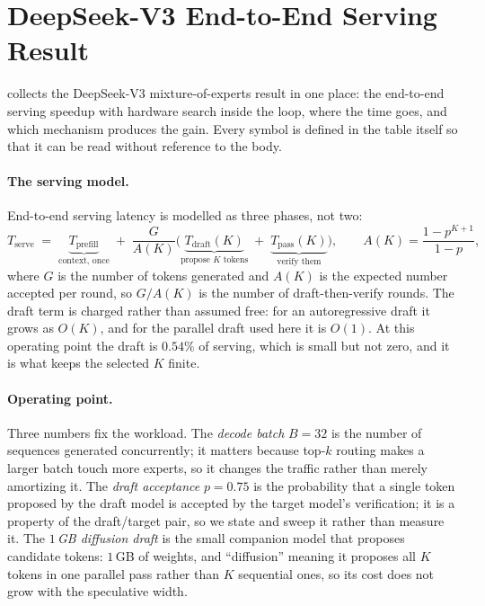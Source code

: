 \section{DeepSeek-V3 End-to-End Serving Result}
\label{app:deepseek_summary}

 collects the DeepSeek-V3 mixture-of-experts result in
one place: the end-to-end serving speedup with hardware search inside the loop,
where the time goes, and which mechanism produces the gain. Every symbol is
defined in the table itself so that it can be read without reference to the body.

\paragraph{The serving model.}
End-to-end serving latency is modelled as three phases, not two:
\[
T_{\mathrm{serve}} \;=\; \underbrace{T_{\mathrm{prefill}}}_{\text{context, once}}
\;+\; \frac{G}{A(K)}\Big(
\underbrace{T_{\mathrm{draft}}(K)}_{\text{propose } K \text{ tokens}}
\;+\;
\underbrace{T_{\mathrm{pass}}(K)}_{\text{verify them}}\Big),
\qquad A(K) = \frac{1-p^{K+1}}{1-p},
\]
where $G$ is the number of tokens generated and $A(K)$ is the expected number
accepted per round, so $G/A(K)$ is the number of draft-then-verify rounds. The
draft term is charged rather than assumed free: for an autoregressive draft it
grows as $O(K)$, and for the parallel draft used here it is $O(1)$. At this
operating point the draft is $0.54\%$ of serving, which is small but not zero,
and it is what keeps the selected $K$ finite.

\paragraph{Operating point.}
Three numbers fix the workload. The \emph{decode batch} $B = 32$ is the number of
sequences generated concurrently; it matters because top-$k$ routing makes a
larger batch touch more experts, so it changes the traffic rather than merely
amortizing it. The \emph{draft acceptance} $p = 0.75$ is the probability that a
single token proposed by the draft model is accepted by the target model's
verification; it is a property of the draft/target pair, so we state and sweep it
rather than measure it. The \emph{$1$\,GB diffusion draft} is the small
companion model that proposes candidate tokens: $1$\,GB of weights, and
``diffusion'' meaning it proposes all $K$ tokens in one parallel pass rather than
$K$ sequential ones, so its cost does not grow with the speculative width.

